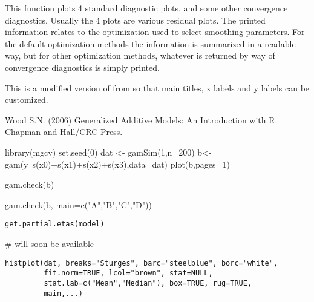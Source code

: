 \documentclass[a4paper]{book}
\begin{document}
%
\begin{Details}\relax
This function plots 4 standard diagnostic plots, and some other convergence
diagnostics. Usually the 4 plots are various residual plots. The printed
information relates to the optimization used to select smoothing parameters.
For the default optimization methods the information is summarized in a readable
way, but for other optimization methods, whatever is returned by way of convergence
diagnostics is simply printed.

This is a modified version of  from  so that
main titles, x labels and y labels can be customized.
\end{Details}
%
\begin{References}\relax
Wood S.N. (2006) Generalized Additive Models: An Introduction with R. Chapman and Hall/CRC Press.
\end{References}
%
\begin{Examples}
\begin{ExampleCode}
library(mgcv)
set.seed(0)
dat <- gamSim(1,n=200)
b<-gam(y~s(x0)+s(x1)+s(x2)+s(x3),data=dat)
plot(b,pages=1)


gam.check(b)                                              

gam.check(b, main=c("A","B","C","D"))                               



\end{ExampleCode}
\end{Examples}
\newpage
{}
%
\begin{Usage}
\begin{verbatim}
get.partial.etas(model)
\end{verbatim}
\end{Usage}
%
\begin{Arguments}
\begin{ldescription}
\item[\code{model}] 


\end{ldescription}
\end{Arguments}
%
\begin{Examples}
\begin{ExampleCode}
# will soon be available
\end{ExampleCode}
\end{Examples}
\newpage
{}
%
\begin{Usage}
\begin{verbatim}
histplot(dat, breaks="Sturges", barc="steelblue", borc="white",
         fit.norm=TRUE, lcol="brown", stat=NULL, 
         stat.lab=c("Mean","Median"), box=TRUE, rug=TRUE, 
         main,...)


\end{verbatim}
\end{Usage}
\end{document}
